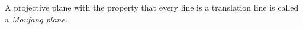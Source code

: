 A projective plane with the property that every line is a translation line is called a \emph{Moufang plane}.
